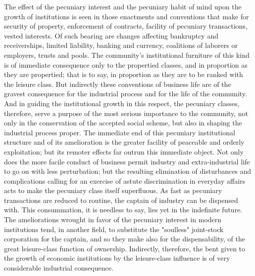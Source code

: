 \documentclass[12pt]{report}
\begin{document}
The effect of the pecuniary interest and the pecuniary habit of
mind upon the growth of institutions is seen in those enactments
and conventions that make for security of property, enforcement of
contracts, facility of pecuniary transactions, vested interests. Of
such bearing are changes affecting bankruptcy and receiverships, limited
liability, banking and currency, coalitions of laborers or employers,
trusts and pools. The community's institutional furniture of this kind
is of immediate consequence only to the propertied classes, and in
proportion as they are propertied; that is to say, in proportion as
they are to be ranked with the leisure class. But indirectly these
conventions of business life are of the gravest consequence for the
industrial process and for the life of the community. And in guiding the
institutional growth in this respect, the pecuniary classes, therefore,
serve a purpose of the most serious importance to the community, not
only in the conservation of the accepted social scheme, but also
in shaping the industrial process proper. The immediate end of this
pecuniary institutional structure and of its amelioration is the greater
facility of peaceable and orderly exploitation; but its remoter effects
far outrun this immediate object. Not only does the more facile conduct
of business permit industry and extra-industrial life to go on with
less perturbation; but the resulting elimination of disturbances and
complications calling for an exercise of astute discrimination in
everyday affairs acts to make the pecuniary class itself superfluous.
As fast as pecuniary transactions are reduced to routine, the captain
of industry can be dispensed with. This consummation, it is needless
to say, lies yet in the indefinite future. The ameliorations wrought in
favor of the pecuniary interest in modern institutions tend, in another
field, to substitute the "soulless" joint-stock corporation for the
captain, and so they make also for the dispensability, of the great
leisure-class function of ownership. Indirectly, therefore, the bent
given to the growth of economic institutions by the leisure-class
influence is of very considerable industrial consequence.
\end{document}
